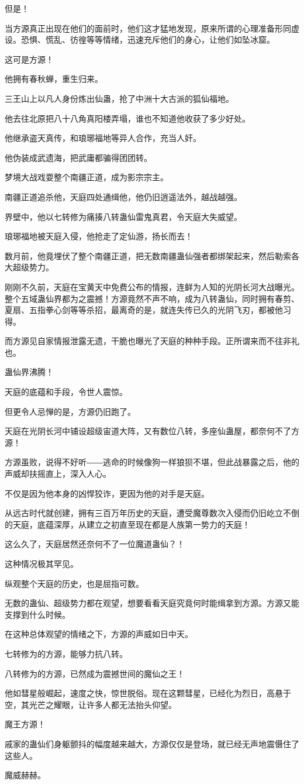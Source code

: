 \begin{this_body}
但是！

当方源真正出现在他们的面前时，他们这才猛地发现，原来所谓的心理准备形同虚设。恐惧、慌乱、彷徨等等情绪，迅速充斥他们的身心，让他们如坠冰窟。

这可是方源！

他拥有春秋蝉，重生归来。

三王山上以凡人身份炼出仙蛊，抢了中洲十大古派的狐仙福地。

他去往北原把八十八角真阳楼弄塌，谁也不知道他收获了多少好处。

他继承盗天真传，和琅琊福地等异人合作，充当人奸。

他伪装成武遗海，把武庸都骗得团团转。

梦境大战戏耍整个南疆正道，成为影宗宗主。

南疆正道追杀他，天庭四处通缉他，他仍旧逍遥法外，越战越强。

界壁中，他以七转修为痛揍八转蛊仙雷鬼真君，令天庭大失威望。

琅琊福地被天庭入侵，他抢走了定仙游，扬长而去！

数月前，他竟埋伏了整个南疆正道，把无数南疆蛊仙强者都绑架起来，然后勒索各大超级势力。

刚刚不久前，天庭在宝黄天中免费公布的情报，连鲜为人知的光阴长河大战曝光。整个五域蛊仙界都为之震撼！方源竟然不声不响，成为八转蛊仙，同时拥有春剪、夏扇、五指拳心剑等等杀招，最离奇的是，就连失传已久的光阴飞刃，都被他习得。

而方源见自家情报泄露无遗，干脆也曝光了天庭的种种手段。正所谓来而不往非礼也。

蛊仙界沸腾！

天庭的底蕴和手段，令世人震惊。

但更令人忌惮的是，方源仍旧跑了。

天庭在光阴长河中铺设超级宙道大阵，又有数位八转，多座仙蛊屋，都奈何不了方源！

方源虽败，说得不好听――逃命的时候像狗一样狼狈不堪，但此战暴露之后，他的声威却扶摇直上，深入人心。

不仅是因为他本身的凶悍狡诈，更因为他的对手是天庭。

从远古时代就创建，拥有三百万年历史的天庭，遭受魔尊数次入侵而仍旧屹立不倒的天庭，底蕴深厚，从建立之初直至现在都是人族第一势力的天庭！

这么久了，天庭居然还奈何不了一位魔道蛊仙？！

这种情况极其罕见。

纵观整个天庭的历史，也是屈指可数。

无数的蛊仙、超级势力都在观望，想要看看天庭究竟何时能缉拿到方源。方源又能支撑到什么时候。

在这种总体观望的情绪之下，方源的声威如日中天。

七转修为的方源，能够力抗八转。

八转修为的方源，已然成为震撼世间的魔仙之王！

他如彗星般崛起，速度之快，惊世脱俗。现在这颗彗星，已经化为烈日，高悬于空，其光芒之耀眼，让许多人都无法抬头仰望。

魔王方源！

戚家的蛊仙们身躯颤抖的幅度越来越大，方源仅仅是登场，就已经无声地震慑住了这些人。

魔威赫赫。

\end{this_body}

